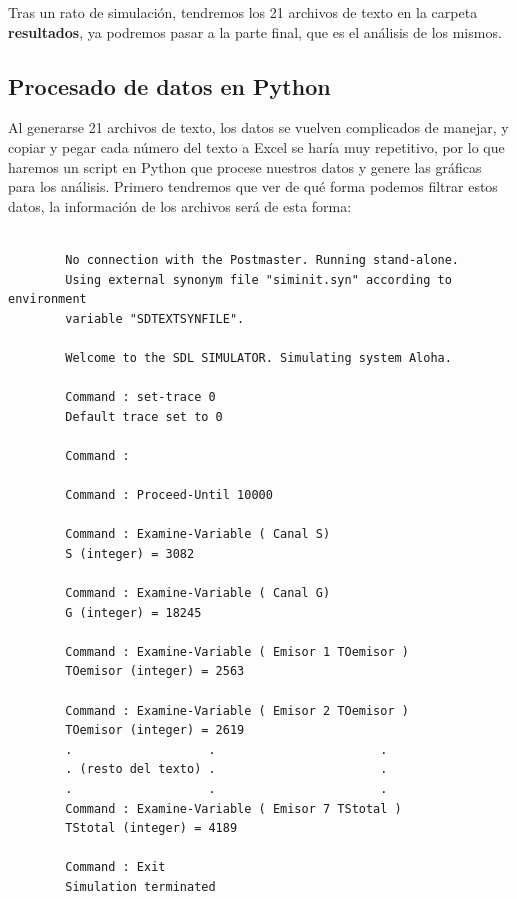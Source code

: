 \documentclass{article}
\begin{document}
Tras un rato de simulación, tendremos los 21 archivos de texto en la carpeta \textbf{resultados}, ya podremos pasar a la parte final, que es el análisis de los mismos.

\subsection{Procesado de datos en Python}

Al generarse 21 archivos de texto, los datos se vuelven complicados de manejar, y copiar y pegar cada número del texto a Excel se haría muy repetitivo, por lo que haremos un script en Python que procese nuestros datos y genere las gráficas para los análisis. Primero tendremos que ver de qué forma podemos filtrar estos datos, la información de los archivos será de esta forma:

\begin{center} 
    \begin{verbatim}

        No connection with the Postmaster. Running stand-alone.
        Using external synonym file "siminit.syn" according to environment 
        variable "SDTEXTSYNFILE".
        
        Welcome to the SDL SIMULATOR. Simulating system Aloha.
        
        Command : set-trace 0
        Default trace set to 0
        
        Command : 
        
        Command : Proceed-Until 10000
        
        Command : Examine-Variable ( Canal S) 
        S (integer) = 3082
        
        Command : Examine-Variable ( Canal G) 
        G (integer) = 18245
        
        Command : Examine-Variable ( Emisor 1 TOemisor )
        TOemisor (integer) = 2563
        
        Command : Examine-Variable ( Emisor 2 TOemisor )
        TOemisor (integer) = 2619
        .                   .                       .
        . (resto del texto) .                       .
        .                   .                       .
        Command : Examine-Variable ( Emisor 7 TStotal )
        TStotal (integer) = 4189
        
        Command : Exit
        Simulation terminated

    \end{verbatim}
    \end{center} 
\quad
\end{document}
